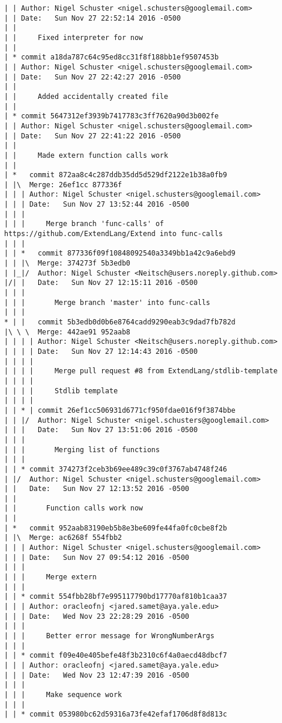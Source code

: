 \begin{lstlisting}
| | Author: Nigel Schuster <nigel.schusters@googlemail.com>
| | Date:   Sun Nov 27 22:52:14 2016 -0500
| | 
| |     Fixed interpreter for now
| |   
| * commit a18da787c64c95ed8cc31f8f188bb1ef9507453b
| | Author: Nigel Schuster <nigel.schusters@googlemail.com>
| | Date:   Sun Nov 27 22:42:27 2016 -0500
| | 
| |     Added accidentally created file
| |   
| * commit 5647312ef3939b7417783c3ff7620a90d3b002fe
| | Author: Nigel Schuster <nigel.schusters@googlemail.com>
| | Date:   Sun Nov 27 22:41:22 2016 -0500
| | 
| |     Made extern function calls work
| |     
| *   commit 872aa8c4c287ddb35dd5d529df2122e1b38a0fb9
| |\  Merge: 26ef1cc 877336f
| | | Author: Nigel Schuster <nigel.schusters@googlemail.com>
| | | Date:   Sun Nov 27 13:52:44 2016 -0500
| | | 
| | |     Merge branch 'func-calls' of https://github.com/ExtendLang/Extend into func-calls
| | |      
| | *   commit 877336f09f10848092540a3349bb1a42c9a6ebd9
| | |\  Merge: 374273f 5b3edb0
| |_|/  Author: Nigel Schuster <Neitsch@users.noreply.github.com>
|/| |   Date:   Sun Nov 27 12:15:11 2016 -0500
| | |   
| | |       Merge branch 'master' into func-calls
| | |      
* | |   commit 5b3edb0d0b6e8764cadd9290eab3c9dad7fb782d
|\ \ \  Merge: 442ae91 952aab8
| | | | Author: Nigel Schuster <Neitsch@users.noreply.github.com>
| | | | Date:   Sun Nov 27 12:14:43 2016 -0500
| | | | 
| | | |     Merge pull request #8 from ExtendLang/stdlib-template
| | | |     
| | | |     Stdlib template
| | | |     
| | * | commit 26ef1cc506931d6771cf950fdae016f9f3874bbe
| | |/  Author: Nigel Schuster <nigel.schusters@googlemail.com>
| | |   Date:   Sun Nov 27 13:51:06 2016 -0500
| | |   
| | |       Merging list of functions
| | |    
| | * commit 374273f2ceb3b69ee489c39c0f3767ab4748f246
| |/  Author: Nigel Schuster <nigel.schusters@googlemail.com>
| |   Date:   Sun Nov 27 12:13:52 2016 -0500
| |   
| |       Function calls work now
| |     
| *   commit 952aab83190eb5b8e3be609fe44fa0fc0cbe8f2b
| |\  Merge: ac6268f 554fbb2
| | | Author: Nigel Schuster <nigel.schusters@googlemail.com>
| | | Date:   Sun Nov 27 09:54:12 2016 -0500
| | | 
| | |     Merge extern
| | |    
| | * commit 554fbb28bf7e995117790bd17770af810b1caa37
| | | Author: oracleofnj <jared.samet@aya.yale.edu>
| | | Date:   Wed Nov 23 22:28:29 2016 -0500
| | | 
| | |     Better error message for WrongNumberArgs
| | |    
| | * commit f09e40e405befe48f3b2310c6f4a0aecd48dbcf7
| | | Author: oracleofnj <jared.samet@aya.yale.edu>
| | | Date:   Wed Nov 23 12:47:39 2016 -0500
| | | 
| | |     Make sequence work
| | |    
| | * commit 053980bc62d59316a73fe42efaf1706d8f8d813c

\end{lstlisting}
